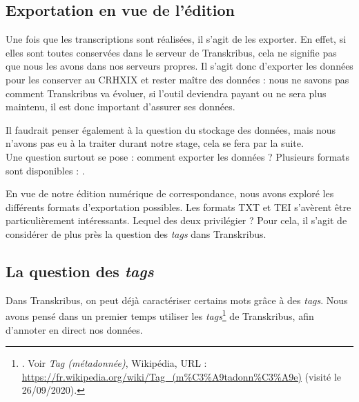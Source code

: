 \subsection{Exportation en vue de l'édition}

Une fois que les transcriptions sont réalisées, il s'agit de les exporter. En effet, si elles sont toutes conservées dans le serveur de Transkribus, cela ne signifie pas que nous les avons dans nos serveurs propres. Il s'agit donc d'exporter les données pour les conserver au CRHXIX et rester maître des données : nous ne savons pas comment Transkribus va évoluer, si l'outil deviendra payant ou ne sera plus maintenu, il est donc important d'assurer ses données. 

Il faudrait penser également à la question du stockage des données, mais nous n'avons pas eu à la traiter durant notre stage, cela se fera par la suite. \\

Une question surtout se pose : comment exporter les données ? Plusieurs formats sont disponibles : .

En vue de notre édition numérique de correspondance, nous avons exploré les différents formats d'exportation possibles. Les formats TXT et TEI s'avèrent être particulièrement intéressants. 
Lequel des deux privilégier ? 
Pour cela, il s'agit de considérer de plus près la question des \emph{tags} dans Transkribus.

\subsection{La question des \emph{tags}}

Dans Transkribus, on peut déjà caractériser certains mots grâce à des \emph{tags}. Nous avons pensé dans un premier temps utiliser les \emph{tags}\footnote{. Voir \emph{Tag (métadonnée)}, Wikipédia, URL : \url{https://fr.wikipedia.org/wiki/Tag_(m\%C3\%A9tadonn\%C3\%A9e)} (visité le 26/09/2020).} de Transkribus, afin d'annoter en direct nos données. 

